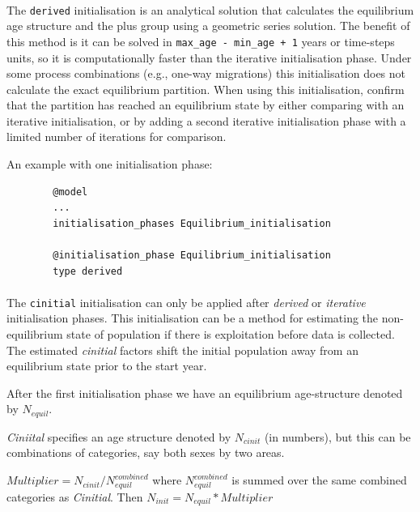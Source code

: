 \paragraph{}

The \texttt{derived} initialisation is an analytical solution that calculates the equilibrium age structure and the plus group using a geometric series solution. The benefit of this method is it can be solved in \texttt{max\_age - min\_age + 1} years or time-steps units, so it is computationally faster than the iterative initialisation phase. Under some process combinations (e.g., one-way migrations) this initialisation does not calculate the exact equilibrium partition. When using this initialisation, confirm that the partition has reached an equilibrium state by either comparing with an iterative initialisation, or by adding a second iterative initialisation phase with a limited number of iterations for comparison.

An example with one initialisation phase:

{\small{\begin{verbatim}
		@model
		...
		initialisation_phases Equilibrium_initialisation

		@initialisation_phase Equilibrium_initialisation
		type derived
		\end{verbatim}}}

\paragraph{}

The \texttt{cinitial} initialisation can only be applied after \textit{derived} or \textit{iterative} initialisation phases. This initialisation can be a method for estimating the non-equilibrium state of population if there is exploitation before data is collected. The estimated \textit{cinitial} factors shift the initial population away from an equilibrium state prior to the start year.

After the first initialisation phase we have an equilibrium age-structure denoted by $N_{equil}$.

\textit{Ciniital} specifies an age structure denoted by $N_{cinit}$ (in numbers), but this can be combinations of categories, say both sexes by two areas.

$Multiplier =  N_{cinit} /  N_{equil}^{combined} $
where $N_{equil}^{combined} $ is summed over the same combined categories as \textit{Cinitial}. Then
$
N_{init} =  N_{equil} *  Multiplier $

